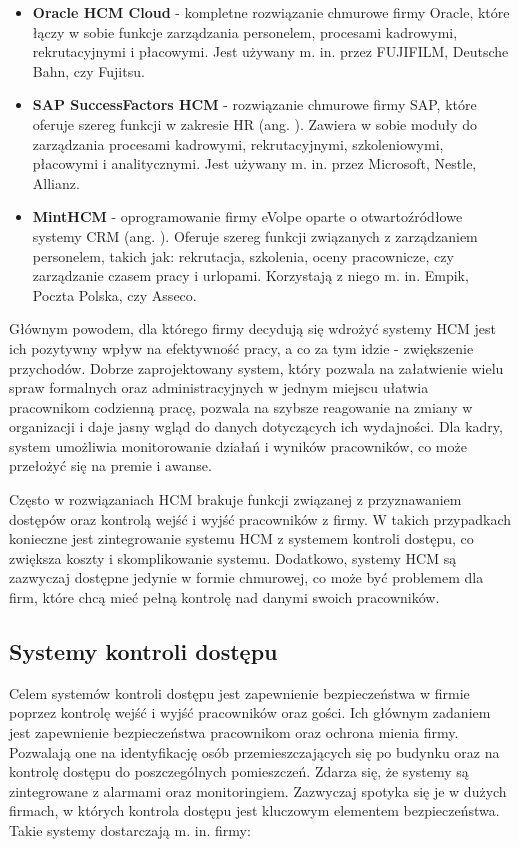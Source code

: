 \begin{itemize}
    \item \textbf{Oracle HCM Cloud}\cite{bib:OracleHCM} - kompletne rozwiązanie chmurowe firmy Oracle, które łączy w sobie funkcje zarządzania personelem, procesami kadrowymi, rekrutacyjnymi i płacowymi. Jest używany m. in. przez FUJIFILM, Deutsche Bahn, czy Fujitsu.
    \item \textbf{SAP SuccessFactors HCM}\cite{bib:SAPHCM} - rozwiązanie chmurowe firmy SAP, które oferuje szereg funkcji w zakresie HR (ang. ). Zawiera w sobie moduły do zarządzania procesami kadrowymi, rekrutacyjnymi, szkoleniowymi, płacowymi i analitycznymi. Jest używany m. in. przez Microsoft, Nestle, Allianz.
    \item \textbf{MintHCM}\cite{bib:MintHCM} - oprogramowanie firmy eVolpe oparte o otwartoźródłowe systemy CRM (ang. ). Oferuje szereg funkcji związanych z zarządzaniem personelem, takich jak: rekrutacja, szkolenia, oceny pracownicze, czy zarządzanie czasem pracy i urlopami.  Korzystają z niego m. in. Empik, Poczta Polska, czy Asseco.
\end{itemize}

Głównym powodem, dla którego firmy decydują się wdrożyć systemy HCM jest ich pozytywny wpływ na efektywność pracy, a co za tym idzie - zwiększenie przychodów. Dobrze zaprojektowany system, który pozwala na załatwienie wielu spraw formalnych oraz administracyjnych w jednym miejscu ułatwia pracownikom codzienną pracę, pozwala na szybsze reagowanie na zmiany w organizacji i daje jasny wgląd do danych dotyczących ich wydajności. Dla kadry, system umożliwia monitorowanie działań i wyników pracowników, co może przełożyć się na premie i awanse.

Często w rozwiązaniach HCM brakuje funkcji związanej z przyznawaniem dostępów oraz kontrolą wejść i wyjść pracowników z firmy. W takich przypadkach konieczne jest zintegrowanie systemu HCM z systemem kontroli dostępu, co zwiększa koszty i skomplikowanie systemu. Dodatkowo, systemy HCM są zazwyczaj dostępne jedynie w formie chmurowej, co może być problemem dla firm, które chcą mieć pełną kontrolę nad danymi swoich pracowników.

\subsection{Systemy kontroli dostępu}

Celem systemów kontroli dostępu jest zapewnienie bezpieczeństwa w firmie poprzez kontrolę wejść i wyjść pracowników oraz gości. Ich głównym zadaniem jest zapewnienie bezpieczeństwa pracownikom oraz ochrona mienia firmy. Pozwalają one na identyfikację osób przemieszczających się po budynku oraz na kontrolę dostępu do poszczególnych pomieszczeń. Zdarza się, że systemy są zintegrowane z alarmami oraz monitoringiem. Zazwyczaj spotyka się je w dużych firmach, w których kontrola dostępu jest kluczowym elementem bezpieczeństwa. Takie systemy dostarczają m. in. firmy:

